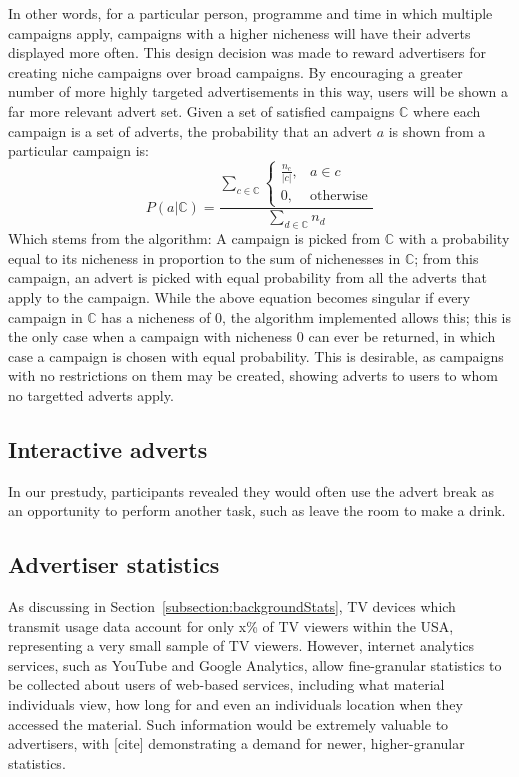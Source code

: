 	In other words, for a particular person, programme and time in which multiple campaigns apply, campaigns with a higher nicheness will have their adverts displayed more often. This design decision was made to reward advertisers for creating niche campaigns over broad campaigns. By encouraging a greater number of more highly targeted advertisements in this way, users will be shown a far more relevant advert set. Given a set of satisfied campaigns $\mathbb{C}$ where each campaign is a set of adverts, the probability that an advert $a$ is shown from a particular campaign is:
	$$
		P(a|\mathbb{C}) =
		\frac{
			\displaystyle \sum_{c \in \mathbb{C}}
			\begin{cases}
				\frac{n_c}{\left|c\right|}, & a \in c \\
				0, & \text{otherwise}
			\end{cases}
		}{
			\displaystyle \sum_{d \in \mathbb{C}} n_d
		}
	$$
Which stems from the algorithm: A campaign is picked from $\mathbb{C}$ with a probability equal to its nicheness in proportion to the sum of nichenesses in $\mathbb{C}$; from this campaign, an advert is picked with equal probability from all the adverts that apply to the campaign. While the above equation becomes singular if every campaign in $\mathbb{C}$ has a nicheness of 0, the algorithm implemented allows this; this is the only case when a campaign with nicheness 0 can ever be returned, in which case a campaign is chosen with equal probability. This is desirable, as campaigns with no restrictions on them may be created, showing adverts to users to whom no targetted adverts apply.

\subsection{Interactive adverts}

	In our prestudy, participants revealed they would often use the advert break as an opportunity to perform another task, such as leave the room to make a drink.

\subsection{Advertiser statistics}

	As discussing in Section~\ref{subsection:backgroundStats}, TV devices which transmit usage data account for only x\% of TV viewers within the USA, representing a very small sample of TV viewers. However, internet analytics services, such as YouTube and Google Analytics, allow fine-granular statistics to be collected about users of web-based services, including what material individuals view, how long for and even an individuals location when they accessed the material. Such information would be extremely valuable to advertisers, with [cite] demonstrating a demand for newer, higher-granular statistics.

